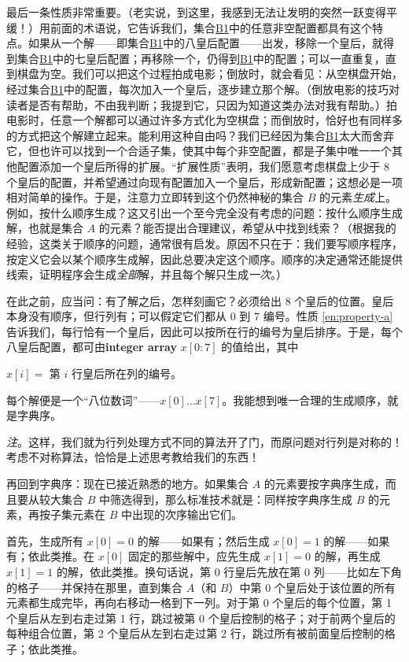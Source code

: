 最后一条性质非常重要。（老实说，到这里，我感到无法让发明的突然一跃变得平缓！）用前面的术语说，它告诉我们，集合\hyperref[en:b1-eight-queens]{B1}中的任意非空配置都具有这个特点。如果从一个解——即集合\hyperref[en:b1-eight-queens]{B1}中的八皇后配置——出发，移除一个皇后，就得到集合\hyperref[en:b1-eight-queens]{B1}中的七皇后配置；再移除一个，仍得到\hyperref[en:b1-eight-queens]{B1}中的配置；可以一直重复，直到棋盘为空。我们可以把这个过程拍成电影；倒放时，就会看见：从空棋盘开始，经过集合\hyperref[en:b1-eight-queens]{B1}中的配置，每次加入一个皇后，逐步建立那个解。（倒放电影的技巧对读者是否有帮助，不由我判断；我提到它，只因为知道这类办法对我有帮助。）拍电影时，任意一个解都可以通过许多方式化为空棋盘；而倒放时，恰好也有同样多的方式把这个解建立起来。能利用这种自由吗？我们已经因为集合\hyperref[en:b1-eight-queens]{B1}太大而舍弃它，但也许可以找到一个合适子集，使其中每个非空配置，都是子集中唯一一个其他配置添加一个皇后所得的扩展。“扩展性质”表明，我们愿意考虑棋盘上少于 8 个皇后的配置，并希望通过向现有配置加入一个皇后，形成新配置；这想必是一项相对简单的操作。于是，注意力立即转到这个仍然神秘的集合 $B$ 的元素\textit{生成}上。例如，按什么顺序生成？这又引出一个至今完全没有考虑的问题：按什么顺序生成解，也就是集合 $A$ 的元素？能否提出合理建议，希望从中找到线索？（根据我的经验，这类关于顺序的问题，通常很有启发。原因不只在于：我们要写顺序程序，按定义它会以某个顺序生成解，因此总要决定这个顺序。顺序的决定通常还能提供线索，证明程序会生成\textit{全部}解，并且每个解只生成\textit{一次}。）

在此之前，应当问：有了解之后，怎样刻画它？必须给出 8 个皇后的位置。皇后本身没有顺序，但行列有；可以假定它们都从 0 到 7 编号。性质 \ref{en:property-a} 告诉我们，每行恰有一个皇后，因此可以按所在行的编号为皇后排序。于是，每个八皇后配置，都可由\textbf{integer array} $x[0:7]$ 的值给出，其中

\noindent
$x[i] =$ 第 $i$ 行皇后所在列的编号。

每个解便是一个“八位数词”——$x[0] \dots x[7]$。我能想到唯一合理的生成顺序，就是字典序。

\noindent
\textit{注}。这样，我们就为行列处理方式不同的算法开了门，而原问题对行列是对称的！考虑不对称算法，恰恰是上述思考教给我们的东西！

再回到字典序：现在已接近熟悉的地方。如果集合 $A$ 的元素要按字典序生成，而且要从较大集合 $B$ 中筛选得到，那么标准技术就是：同样按字典序生成 $B$ 的元素，再按子集元素在 $B$ 中出现的次序输出它们。

首先，生成所有 $x[0] = 0$ 的解——如果有；然后生成 $x[0] = 1$ 的解——如果有；依此类推。在 $x[0]$ 固定的那些解中，应先生成 $x[1] = 0$ 的解，再生成 $x[1] = 1$ 的解，依此类推。换句话说，第 0 行皇后先放在第 0 列——比如左下角的格子——并保持在那里，直到集合 $A$（和 $B$）中第 0 个皇后处于该位置的所有元素都生成完毕，再向右移动一格到下一列。对于第 0 个皇后的每个位置，第 1 个皇后从左到右走过第 1 行，跳过被第 0 个皇后控制的格子；对于前两个皇后的每种组合位置，第 2 个皇后从左到右走过第 2 行，跳过所有被前面皇后控制的格子；依此类推。

